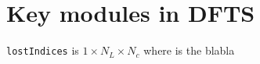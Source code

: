 \chapter{Key modules in DFTS} \label{chapt:modules}

\verb|lostIndices| is $1 \times N_L \times N_c$ where is the blabla